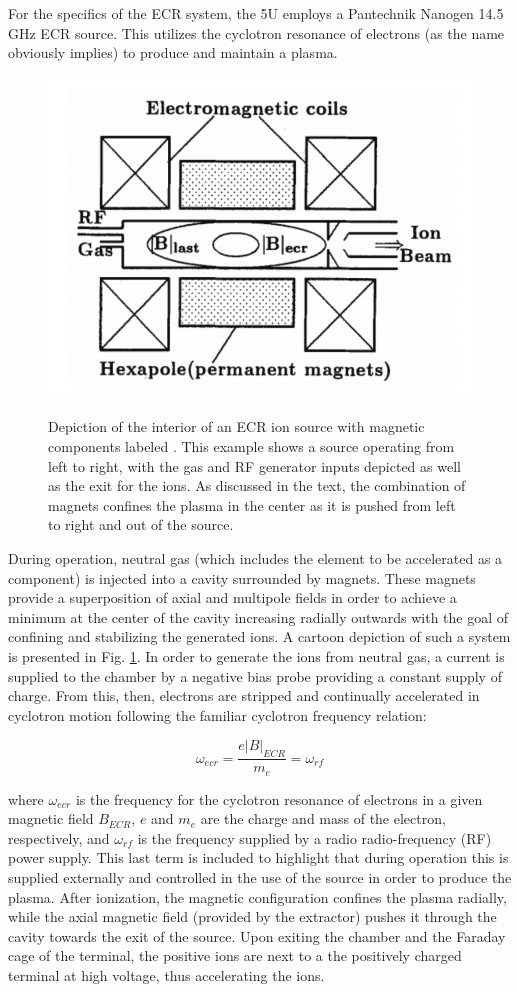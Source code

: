 For the specifics of the ECR system, the 5U employs a Pantechnik Nanogen 14.5 GHz ECR source. This utilizes the cyclotron resonance of electrons (as the name obviously implies) to produce and maintain a plasma.


\begin{figure}
\centering
\includegraphics[width=0.5\linewidth]{figures/ecrSchematic.png}
\label{fig: ecris}
\caption{Depiction of the interior of an ECR ion source with magnetic components labeled \cite{Melin1997}. This example shows a source operating from left to right, with the gas and RF generator inputs depicted as well as the exit for the ions. As discussed in the text, the combination of magnets confines the plasma in the center as it is pushed from left to right and out of the source.}
\end{figure}


During operation, neutral gas (which includes the element to be accelerated as a component) is injected into a cavity surrounded by magnets. These magnets provide a superposition of axial and multipole fields in order to achieve a minimum at the center of the cavity increasing radially outwards with the goal of confining and stabilizing the generated ions. A cartoon depiction of such a system is presented in Fig. \ref{fig: ecris}. In order to generate the ions from neutral gas, a current is supplied to the chamber by a negative bias probe providing a constant supply of charge. From this, then, electrons are stripped and continually accelerated in cyclotron motion following the familiar cyclotron frequency relation:

\begin{equation}
\omega_{ecr} = \dfrac{e | B |_{ECR}}{m_{e}} = \omega_{rf}
\label{eqn: ecr}
\end{equation}

\noindent where $\omega_{ecr}$ is the frequency for the cyclotron resonance of electrons in a given magnetic field $B_{ECR}$, $e$ and $m_{e}$ are the charge and mass of the electron, respectively, and $\omega_{rf}$ is the frequency supplied by a radio radio-frequency (RF) power supply. This last term is included to highlight that during operation this is supplied externally and controlled in the use of the source in order to produce the plasma. After ionization, the magnetic configuration confines the plasma radially, while the axial magnetic field (provided by the extractor) pushes it through the cavity towards the exit of the source. Upon exiting the chamber and the Faraday cage of the terminal, the positive ions are next to a the positively charged terminal at high voltage, thus accelerating the ions. 

